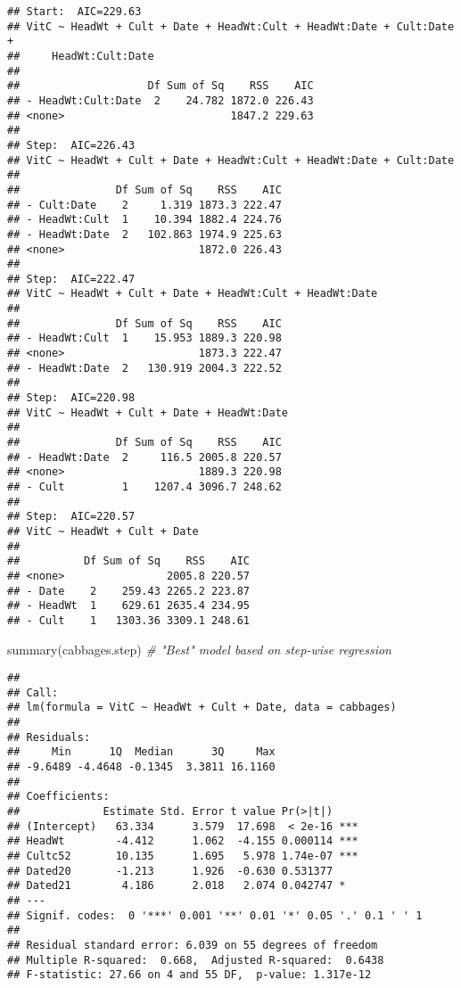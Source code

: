 \documentclass[
]{article}
\newenvironment{Shaded}{\begin{snugshade}}{\end{snugshade}}
\newcommand{\CommentTok}[1]{\textcolor[rgb]{0.56,0.35,0.01}{\textit{#1}}}
\newcommand{\FunctionTok}[1]{\textcolor[rgb]{0.00,0.00,0.00}{#1}}
\newcommand{\NormalTok}[1]{#1}
\begin{document}
\begin{verbatim}
## Start:  AIC=229.63
## VitC ~ HeadWt + Cult + Date + HeadWt:Cult + HeadWt:Date + Cult:Date + 
##     HeadWt:Cult:Date
## 
##                    Df Sum of Sq    RSS    AIC
## - HeadWt:Cult:Date  2    24.782 1872.0 226.43
## <none>                          1847.2 229.63
## 
## Step:  AIC=226.43
## VitC ~ HeadWt + Cult + Date + HeadWt:Cult + HeadWt:Date + Cult:Date
## 
##               Df Sum of Sq    RSS    AIC
## - Cult:Date    2     1.319 1873.3 222.47
## - HeadWt:Cult  1    10.394 1882.4 224.76
## - HeadWt:Date  2   102.863 1974.9 225.63
## <none>                     1872.0 226.43
## 
## Step:  AIC=222.47
## VitC ~ HeadWt + Cult + Date + HeadWt:Cult + HeadWt:Date
## 
##               Df Sum of Sq    RSS    AIC
## - HeadWt:Cult  1    15.953 1889.3 220.98
## <none>                     1873.3 222.47
## - HeadWt:Date  2   130.919 2004.3 222.52
## 
## Step:  AIC=220.98
## VitC ~ HeadWt + Cult + Date + HeadWt:Date
## 
##               Df Sum of Sq    RSS    AIC
## - HeadWt:Date  2     116.5 2005.8 220.57
## <none>                     1889.3 220.98
## - Cult         1    1207.4 3096.7 248.62
## 
## Step:  AIC=220.57
## VitC ~ HeadWt + Cult + Date
## 
##          Df Sum of Sq    RSS    AIC
## <none>                2005.8 220.57
## - Date    2    259.43 2265.2 223.87
## - HeadWt  1    629.61 2635.4 234.95
## - Cult    1   1303.36 3309.1 248.61
\end{verbatim}

\begin{Shaded}
\begin{Highlighting}[]
\FunctionTok{summary}\NormalTok{(cabbages.step) }\CommentTok{\# "Best" model based on step{-}wise regression}
\end{Highlighting}
\end{Shaded}

\begin{verbatim}
## 
## Call:
## lm(formula = VitC ~ HeadWt + Cult + Date, data = cabbages)
## 
## Residuals:
##     Min      1Q  Median      3Q     Max 
## -9.6489 -4.4648 -0.1345  3.3811 16.1160 
## 
## Coefficients:
##             Estimate Std. Error t value Pr(>|t|)    
## (Intercept)   63.334      3.579  17.698  < 2e-16 ***
## HeadWt        -4.412      1.062  -4.155 0.000114 ***
## Cultc52       10.135      1.695   5.978 1.74e-07 ***
## Dated20       -1.213      1.926  -0.630 0.531377    
## Dated21        4.186      2.018   2.074 0.042747 *  
## ---
## Signif. codes:  0 '***' 0.001 '**' 0.01 '*' 0.05 '.' 0.1 ' ' 1
## 
## Residual standard error: 6.039 on 55 degrees of freedom
## Multiple R-squared:  0.668,  Adjusted R-squared:  0.6438 
## F-statistic: 27.66 on 4 and 55 DF,  p-value: 1.317e-12
\end{verbatim}
\end{document}

